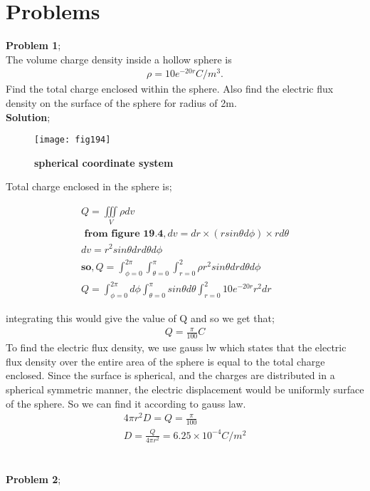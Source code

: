  \section{Problems}
 \textbf{Problem 1};\\
 The volume charge density inside a hollow sphere is 
 \begin{align*}
 \rho=10e^{-20r} C/m^{3}.
 \end{align*}
 Find the total charge enclosed within the sphere. Also find the electric flux density on the surface of the sphere for radius of 2m.\\
 \textbf{Solution};\\
 \begin{figure}[h]
 	\centering
 	\texttt{[image: fig194]}
 	\caption{\textbf{spherical coordinate system}}
 \end{figure} 
 Total charge enclosed in the sphere is;
 \begin{center}
 	 \begin{align*}
 	Q=\iiint\limits_V\rho dv\\
 	\textbf{ from figure 19.4}, dv= dr\times(rsin\theta d\phi)\times rd\theta \\
 	dv=r^{2}sin\theta drd\theta d\phi\\
 	\textbf{so}, Q=\int^{2\pi}_{\phi=0}\int^{\pi}_{\theta=0}\int^{2}_{r=0} \rho r^{2}sin\theta drd\theta d\phi\\
 	Q= \int^{2\pi}_{\phi=0}d\phi\int^{\pi}_{\theta=0}sin\theta d\theta\int^{2}_{r=0}10e^{-20r}r^{2}dr
 	 \end{align*}
 \end{center}
 integrating this would give the value of Q and so we get that;
 \begin{align*}
 Q=\frac{\pi}{100} C
 \end{align*}
 To find the electric flux density, we use gauss lw which states that the electric flux density over the entire area of the sphere is equal to the total charge enclosed. Since the surface is  spherical, and the charges are distributed in a spherical symmetric manner, the electric displacement would be uniformly surface of the sphere. So we can find it according to gauss law.
\begin{align}
4\pi r^{2}D=Q=\frac{\pi}{100}\\
D=\frac{Q}{4\pi r^{2}}= 6.25\times10^{-4} C/m^{2}
\end{align}
 \\\\
 \textbf{Problem 2};\\
